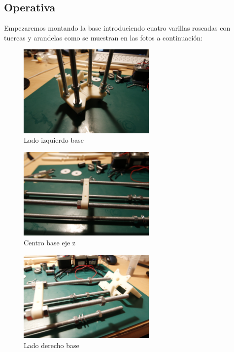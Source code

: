 			\subsection{Operativa}
		Empezaremos montando la base introduciendo cuatro varillas roscadas con tuercas y arandelas como se muestran en las fotos a continuación:
		\begin{figure}[!htp]
			\centering
			\includegraphics[width=0.6\textwidth]{../../Fotos/69.jpg}
			\caption{Lado izquierdo base}
			\label{fig:1.z}
		\end{figure}
		\begin{figure}[!htp]
			\centering
			\includegraphics[width=0.6\textwidth]{../../Fotos/70.jpg}
			\caption{Centro base eje z}
			\label{fig:2.z}
		\end{figure}
		\begin{figure}[!htp]
			\centering
			\includegraphics[width=0.6\textwidth]{../../Fotos/72.jpg}
			\caption{Lado derecho base}
			\label{fig:3.z}
		\end{figure}
